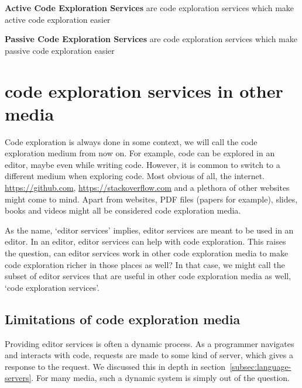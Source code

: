 \begin{definition}
    \textbf{Active Code Exploration Services} are code exploration services which make active code exploration easier
\end{definition}
\begin{definition}
    \textbf{Passive Code Exploration Services} are code exploration services which make passive code exploration easier
\end{definition}


\section*{code exploration services in other media}

Code exploration is always done in some context, we will call the code exploration medium from now on.
For example, code can be explored in an editor, maybe even while writing code.
However, it is common to switch to a different medium when exploring code.
Most obvious of all, the internet.
\url{https://github.com}, \url{https://stackoverflow.com} and a plethora of other websites might come to mind.
Apart from websites, PDF files (papers for example), slides, books and videos might all be considered code exploration media.

As the name, `editor services' implies, editor services are meant to be used in an editor.
In an editor, editor services can help with code exploration.
This raises the question, can editor services work in other code exploration media to make code exploration richer in those places as well?
In that case, we might call the subset of editor services that are useful in other code exploration media as well, `code exploration services'.


\subsection{Limitations of code exploration media}\label{subsec:limitations-of-code-exploration-media}

Providing editor services is often a dynamic process.
As a programmer navigates and interacts with code, requests are made to some kind of server, which gives a response to the request.
We discussed this in depth in section~\ref{subsec:language-servers}.
For many media, such a dynamic system is simply out of the question.

